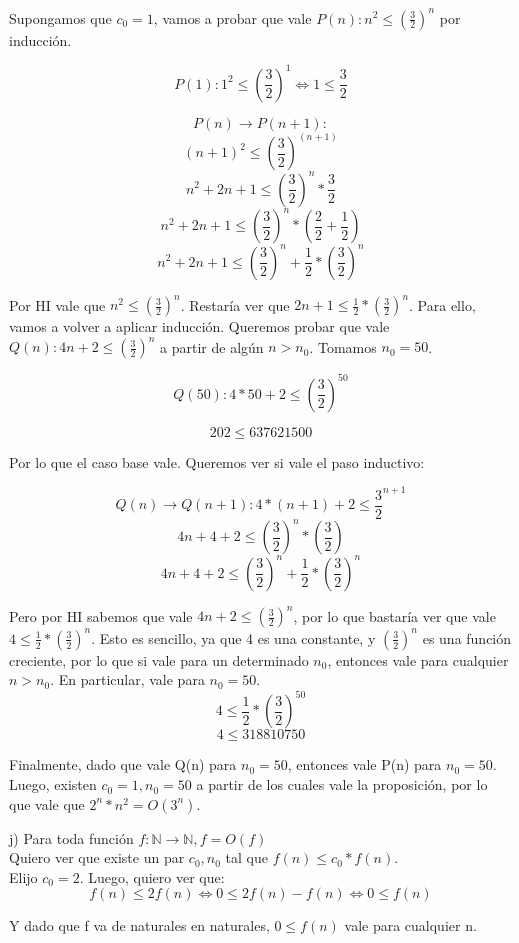 \documentclass[11pt, spanish]{article}
\begin{document}
Supongamos que $c_0=1$, vamos a probar que vale $P(n): n^2 \leq (\frac{3}{2})^n$ por inducción.

\[
P(1): 1^2 \leq (\frac{3}{2})^1 \iff 1 \leq \frac{3}{2}
\]

\[ P(n) \rightarrow P(n+1): \]
\[ (n+1)^2 \leq (\frac{3}{2})^{(n+1)} \]
\[ n^2 + 2n + 1 \leq (\frac{3}{2})^n*\frac{3}{2} \]
\[ n^2 + 2n + 1 \leq (\frac{3}{2})^n*(\frac{2}{2}+\frac{1}{2}) \]
\[ n^2 + 2n + 1 \leq (\frac{3}{2})^n + \frac{1}{2}*(\frac{3}{2})^n \]

Por HI vale que $n^2 \leq (\frac{3}{2})^n$. Restaría ver que $2n + 1 \leq \frac{1}{2}*(\frac{3}{2})^n$.
Para ello, vamos a volver a aplicar inducción. Queremos probar que vale $Q(n): 4n + 2 \leq (\frac{3}{2})^n$ a partir de algún $n>n_0$. Tomamos $n_0=50$.

\[
Q(50): 4*50 + 2 \leq (\frac{3}{2})^{50}
\]

\[
202 \leq 637621500
\]

Por lo que el caso base vale. Queremos ver si vale el paso inductivo: 

\[
Q(n) \rightarrow Q(n+1): 4*(n+1) + 2 \leq \frac{3}{2}^{n+1}
\]
\[
4n + 4 + 2 \leq (\frac{3}{2})^{n} * (\frac{3}{2})
\]
\[
4n + 4 + 2 \leq (\frac{3}{2})^{n} + \frac{1}{2}*(\frac{3}{2})^n
\]

Pero por HI sabemos que vale $4n + 2 \leq (\frac{3}{2})^{n}$, por lo que bastaría ver que vale $4 \leq \frac{1}{2}*(\frac{3}{2})^n$. Esto es sencillo, ya que 4 es una constante, y $(\frac{3}{2})^n$ es una función creciente, por lo que si vale para un determinado $n_0$, entonces vale para cualquier $n>n_0$. En particular, vale para $n_0=50$.
\[
4 \leq \frac{1}{2}*(\frac{3}{2})^{50}
\]
\[
4 \leq 318810750
\]

Finalmente, dado que vale Q(n) para $n_0=50$, entonces vale P(n) para $n_0=50$. Luego, existen $c_0=1, n_0=50$ a partir de los cuales vale la proposición, por lo que vale que $2^n*n^2 = O(3^n)$.


\vspace{1em}
j) Para toda función $f: \mathbb{N} \to \mathbb{N}, f=O(f)$\\

Quiero ver que existe un par $c_0,n_0$ tal que $f(n) \leq c_0*f(n)$.\\

Elijo $c_0=2$. Luego, quiero ver que:
\[ f(n) \leq 2f(n) \iff 0 \leq 2f(n)-f(n) \iff 0 \leq f(n) \]

Y dado que f va de naturales en naturales, $0 \leq f(n)$ vale para cualquier n.
\end{document}
